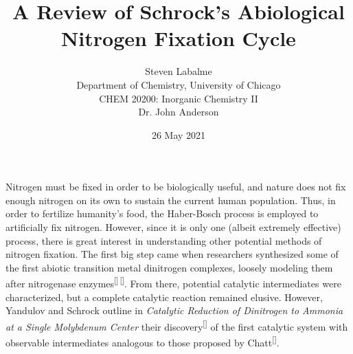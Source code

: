 \documentclass[titlepage,12pt]{article}
\title{A Review of Schrock's Abiological Nitrogen Fixation Cycle}
\author{
    Steven Labalme\\
    Department of Chemistry, University of Chicago\\
    CHEM 20200: Inorganic Chemistry II\\
    Dr. John Anderson
}
\date{26 May 2021}
\begin{document}
\begin{doublespace}
    \maketitle
\end{doublespace}



Nitrogen must be fixed in order to be biologically useful, and nature does not fix enough nitrogen on its own to sustain the current human population. Thus, in order to fertilize humanity’s food, the Haber-Bosch process is employed to artificially fix nitrogen. However, since it is only one (albeit extremely effective) process, there is great interest in understanding other potential methods of nitrogen fixation. The first big step came when researchers synthesized some of the first abiotic transition metal dinitrogen complexes, loosely modeling them after nitrogenase enzymes\textsuperscript{[}\autocite{bib:AllenSenoff}\textsuperscript{]\,[}\autocite{bib:Yamamoto}\textsuperscript{]}. From there, potential catalytic intermediates were characterized, but a complete catalytic reaction remained elusive. However, Yandulov and Schrock outline in \emph{Catalytic Reduction of Dinitrogen to Ammonia at a Single Molybdenum Center} their discovery\textsuperscript{[}\autocite{bib:SchrockYandulov}\textsuperscript{]} of the first catalytic system with observable intermediates analogous to those proposed by Chatt\textsuperscript{[}\autocite{bib:Chatt}\textsuperscript{]}.
\end{document}
